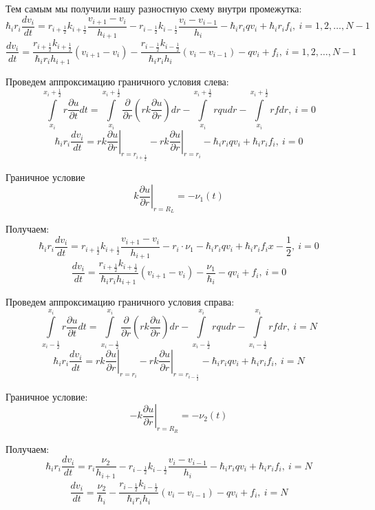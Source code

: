 Тем самым мы получили нашу разностную схему внутри промежутка:
\[
  \hbar_i r_i \frac{d v_i}{dt} = r_{i + \frac{1}{2}} k_{i + \frac{1}{2}} \frac{v_{i+1}-v_i}{h_{i + 1}} 
  - r_{i - \frac{1}{2}} k_{i - \frac{1}{2}} \frac{v_{i}-v_{i-1}}{h_{i}} -\hbar_i r_i q v_i + \hbar_i r_i f_i,\ i = 1, 2, \dots, N-1
\]
\[
  \frac{d v_i}{dt} = \frac{r_{i + \frac{1}{2}} k_{i + \frac{1}{2}}}{\hbar_i r_i h_{i + 1}} (v_{i+1}-v_i)
  - \frac{r_{i - \frac{1}{2}} k_{i - \frac{1}{2}}}{\hbar_i r_i h_{i}} (v_{i}-v_{i-1}) - q v_i + f_i,\ i = 1, 2, \dots, N-1
\]

Проведем аппроксимацию граничного условия слева:
\[
  \int\limits^{x_i+\frac{1}{2}}_{x_i} r \frac{\partial u}{\partial t} dt =
  \int\limits^{x_i+\frac{1}{2}}_{x_i} \frac{\partial}{\partial r} \left ( rk\frac{\partial u}{\partial r} \right ) dr
  - \int\limits^{x_i+\frac{1}{2}}_{x_i} rqu dr - \int\limits^{x_i+\frac{1}{2}}_{x_i} rf dr,\ i = 0
\]
\[
  \hbar_i r_i \frac{d v_i}{dt} = \left . rk \frac{\partial u}{\partial r} \right \vert_{r=r_{i+\frac{1}{2}}}
  - \left . rk \frac{\partial u}{\partial r} \right \vert_{r=r_i} -\hbar_i r_i q v_i + \hbar_i r_i f_i,\ i = 0
\]

Граничное условие
\[
  k \left. \frac{\partial u}{\partial r}\right\vert_{r = R_L} = -\nu_1(t)
\]

Получаем:
\[
  \hbar_i r_i \frac{d v_i}{dt} = r_{i + \frac{1}{2}} k_{i + \frac{1}{2}} \frac{v_{i+1}-v_i}{h_{i + 1}} 
  - r_i \cdot \nu_1 - \hbar_i r_i q v_i + \hbar_i r_i f_ix-\frac{1}{2},\ i = 0
\]
\[
  \frac{d v_i}{dt} = \frac{r_{i + \frac{1}{2}} k_{i + \frac{1}{2}}}{\hbar_i r_i h_{i + 1}} (v_{i+1}-v_i)
  - \frac{\nu_1}{\hbar_i} - q v_i + f_i,\ i = 0
\]

Проведем аппроксимацию граничного условия справа:
\[
  \int\limits^{x_i}_{x_i-\frac{1}{2}} r \frac{\partial u}{\partial t} dt =
  \int\limits^{x_i}_{x_i-\frac{1}{2}} \frac{\partial}{\partial r} \left ( rk\frac{\partial u}{\partial r} \right ) dr
  - \int\limits^{x_i}_{x_i-\frac{1}{2}} rqu dr - \int\limits^{x_i}_{x_i-\frac{1}{2}} rf dr,\ i = N
\]
\[
  \hbar_i r_i \frac{d v_i}{dt} = \left . rk \frac{\partial u}{\partial r} \right \vert_{r=r_i}
  - \left . rk \frac{\partial u}{\partial r} \right \vert_{r=r_{i-\frac{1}{2}}} -\hbar_i r_i q v_i + \hbar_i r_i f_i,\ i = N
\]

Граничное условие:
\[
  -k \left. \frac{\partial u}{\partial r}\right\vert_{r = R_R} = -\nu_2(t)
\]

Получаем:
\[
  \hbar_i r_i \frac{d v_i}{dt} = r_{i } \frac{\nu_2}{h_{i + 1}} 
  - r_{i - \frac{1}{2}} k_{i - \frac{1}{2}} \frac{v_{i}-v_{i-1}}{h_{i}} -\hbar_i r_i q v_i + \hbar_i r_i f_i,\ i = N
\]
\[
  \frac{d v_i}{dt} = \frac{\nu_2}{\hbar_i}
  - \frac{r_{i - \frac{1}{2}} k_{i - \frac{1}{2}}}{\hbar_i r_i h_{i}} (v_{i}-v_{i-1}) - q v_i + f_i,\ i = N
\]

